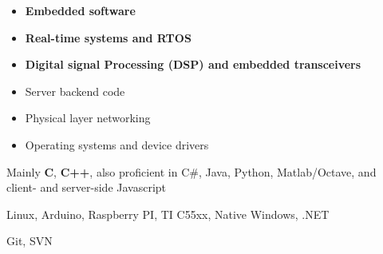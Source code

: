 
\begin{itemize}[noitemsep,topsep=0pt,parsep=0pt,partopsep=0pt]
    \item \textbf{Embedded software}
    \item \textbf{Real-time systems and RTOS}
    \item \textbf{Digital signal Processing (DSP) and embedded transceivers}
    \item Server backend code
    \item Physical layer networking
    \item Operating systems and device drivers
\end{itemize}
\smallskip

Mainly \textbf{C}, \textbf{C++}, also proficient in C\#, Java, Python, Matlab/Octave, and client- and server-side Javascript
\smallskip

Linux, Arduino, Raspberry PI, TI C55xx, Native Windows, .NET
\smallskip

Git, SVN
\smallskip
